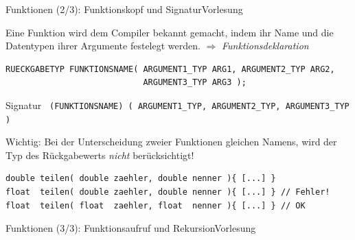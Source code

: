 \documentclass[xcolor=dvipsnames]{beamer}
\newcounter{lecturecounter}
\begin{document}
\begin{frame}[fragile]{Funktionen (2/3): Funktionskopf und Signatur}{Vorlesung }
\begin{block}{}
  Eine Funktion wird dem Compiler bekannt gemacht, indem ihr Name und die Datentypen ihrer Argumente festelegt werden. $\Rightarrow$ \emph{Funktionsdeklaration}
\end{block}

\begin{lstlisting}
RUECKGABETYP FUNKTIONSNAME( ARGUMENT1_TYP ARG1, ARGUMENT2_TYP ARG2,
                            ARGUMENT3_TYP ARG3 );
\end{lstlisting}
\begin{block}{Signatur}
  {\footnotesize \verb| (FUNKTIONSNAME) ( ARGUMENT1_TYP, ARGUMENT2_TYP, ARGUMENT3_TYP ) | }
\end{block}

\begin{block}{}
  Wichtig: Bei der Unterscheidung zweier Funktionen gleichen Namens, wird der Typ des Rückgabewerts \emph{nicht} berücksichtigt!
\end{block}
\begin{lstlisting}
double teilen( double zaehler, double nenner ){ [...] }
float  teilen( double zaehler, double nenner ){ [...] } // Fehler!
float  teilen( float  zaehler, float  nenner ){ [...] } // OK
\end{lstlisting}
\end{frame}

\begin{frame}[fragile]{Funktionen (3/3): Funktionsaufruf und Rekursion}{Vorlesung }
\end{frame}
\end{document}
